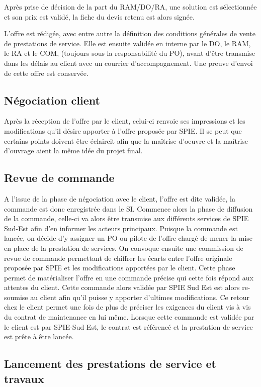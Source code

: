 Après prise de décision de la part du RAM/DO/RA, une solution est sélectionnée et son prix est validé, la fiche du devis retenu est alors signée.

L’offre est rédigée, avec entre autre la définition des conditions générales de vente de prestations de service. Elle est ensuite validée en interne par le DO, le RAM, le RA et le COM, (toujours sous la responsabilité du PO), avant d’être transmise dans les délais au client avec un courrier d’accompagnement. Une preuve d’envoi de cette offre est conservée.

\subsection{Négociation client}

Après la réception de l’offre par le client, celui-ci renvoie ses impressions et les modifications qu’il désire apporter à l’offre proposée par SPIE. Il se peut que certains points doivent être éclaircit afin que la maîtrise d’oeuvre et la maîtrise d’ouvrage aient la même idée du projet final.

\subsection{Revue de commande}

A l’issue de la phase de négociation avec le client, l’offre est dite validée, la commande est donc enregistrée dans le SI. Commence alors la phase de diffusion de la commande, celle-ci va alors être transmise aux différents services de SPIE Sud-Est afin d’en informer les acteurs principaux. Puisque la commande est lancée, on décide d’y assigner un PO ou pilote de l’offre chargé de mener la mise en place de la prestation de services. On convoque ensuite une commission de revue de commande permettant de chiffrer les écarts entre l’offre originale proposée par SPIE et les modifications apportées par le client. Cette phase permet de matérialiser l’offre en une commande précise qui cette fois répond aux attentes du client. Cette commande alors validée par SPIE Sud Est est alors re-soumise au client afin qu’il puisse y apporter d’ultimes modifications. Ce retour chez le client permet une fois de plus de préciser les exigences du client vis à vis du contrat de maintenance en lui même. Lorsque cette commande est validée par le client est par SPIE-Sud Est, le contrat est référencé et la prestation de service est prête à être lancée.

\subsection{Lancement des prestations de service et travaux}

